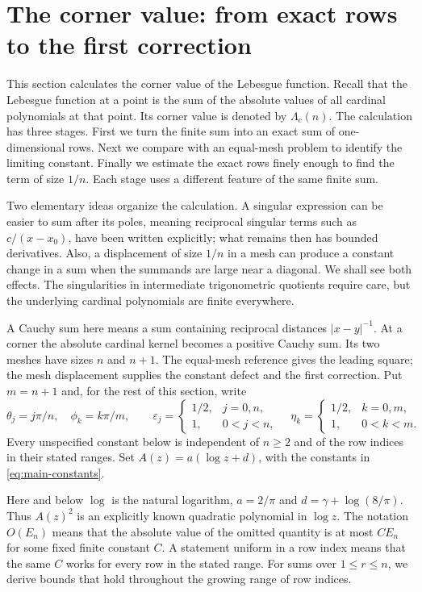 \section{The corner value: from exact rows to the first correction}
\label{sec:corner}

This section calculates the corner value of the Lebesgue function. Recall that the Lebesgue
function at a point is the sum of the absolute values of all cardinal
polynomials at that point. Its corner value is denoted by
$\Lambda_c(n)$. The calculation has three stages. First we turn the
finite sum into an exact sum of one-dimensional rows. Next we compare
with an equal-mesh problem to identify the limiting constant. Finally
we estimate the exact rows finely enough to find the term of size
$1/n$. Each stage uses a different feature of the same finite sum.

Two elementary ideas organize the calculation. A singular expression
can be easier to sum after its poles, meaning reciprocal singular
terms such as $c/(x-x_0)$, have been written explicitly;
what remains then has bounded derivatives. Also, a displacement of
size $1/n$ in a mesh can produce a constant change in a sum when the
summands are large near a diagonal. We shall see both effects. The
singularities in intermediate trigonometric quotients require care,
but the underlying cardinal polynomials are finite everywhere.

A Cauchy sum here means a sum containing reciprocal distances
$|x-y|^{-1}$. At a corner the absolute cardinal kernel becomes a positive Cauchy sum.
Its two meshes have sizes $n$ and $n+1$. The equal-mesh reference gives
the leading square; the mesh displacement supplies the constant defect
and the first correction.
Put $m=n+1$ and, for the rest of this section, write
\[
 \theta_j=j\pi/n,\quad \phi_k=k\pi/m,\qquad
 \varepsilon_j=\begin{cases}1/2,&j=0,n,\\1,&0<j<n,\end{cases}
 \quad \eta_k=\begin{cases}1/2,&k=0,m,\\1,&0<k<m.\end{cases}
\]
Every unspecified constant below is independent of $n\geq2$ and of the
row indices in their stated ranges. Set $A(z)=a(\log z+d)$, with the
constants in \eqref{eq:main-constants}.

Here and below $\log$ is the natural logarithm, $a=2/\pi$ and
$d=\gamma+\log(8/\pi)$. Thus $A(z)^2$ is an explicitly known
quadratic polynomial in $\log z$. The notation $O(E_n)$ means that
the absolute value of the omitted quantity is at most $CE_n$ for
some fixed finite constant $C$. A statement uniform in a row index
means that the same $C$ works for every row in the stated range.
For sums over $1\leq r\leq n$, we derive bounds that hold throughout
the growing range of row indices.

